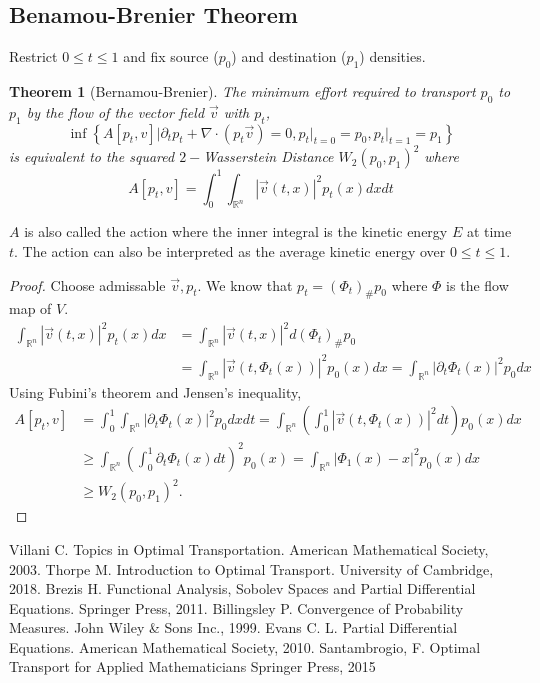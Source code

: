 \documentclass[12pt]{article}
\theoremstyle{plain}
\newtheorem{thm}{Theorem}[section]
\numberwithin{equation}{section}
\begin{document}
\subsection{Benamou-Brenier Theorem}
Restrict $0\le t \le 1$ and fix source ($p_0$) and destination ($p_1$) densities.
\begin{thm}[Bernamou-Brenier]
	The minimum effort required to transport $p_0$ to $p_1$ by the flow of the vector field $\vec{v}$ with $p_t$,
	\begin{equation}
		\inf\left\{A[p_t,v]\bigg\vert\partial_t p_t + \nabla \cdot (p_t \vec{v}) = 0,p_t\vert_{t=0}=p_0, p_t\vert_{t=1}=p_1\right\}
	\end{equation} 
	is equivalent to the squared $2-$Wasserstein Distance $W_2(p_0,p_1)^2$ where \[A[p_t,v] = \int_0^1\int_{\mathbb{R}^n} |\vec{v}(t,x)|^2p_t(x)dxdt\]
\end{thm}
$A$ is also called the action where the inner integral is the kinetic energy $E$ at time $t$. The action can also be interpreted as the average kinetic energy over $0\le t \le 1$. 
\begin{proof}
	Choose admissable $\vec{v},p_t$. We know that $p_t = (\Phi_t)_\#p_0$ where $\Phi$ is the flow map of $V$.
	\begin{align*}
		\int_{\mathbb{R}^n}|\vec{v}(t,x)|^2p_t(x)dx &= \int_{\mathbb{R}^n}|\vec{v}(t,x)|^2 d(\Phi_t)_\#p_0\\
		&= \int_{\mathbb{R}^n}|\vec{v}(t,\Phi_t(x))|^2p_0(x)dx = \int_{\mathbb{R}^n}|\partial_t\Phi_t(x)|^2p_0dx
	\end{align*}
	Using Fubini's theorem and Jensen's inequality,
	\begin{align*}
		A[p_t,v] &= \int_0^1\int_{\mathbb{R}^n}|\partial_t\Phi_t(x)|^2p_0dxdt= \int_{\mathbb{R}^n}\left(\int_0^1|\vec{v}(t,\Phi_t(x))|^2dt\right)p_0(x)dx \\
		&\ge \int_{\mathbb{R}^n}\left(\int_0^1\partial_t\Phi_t(x)dt\right)^2p_0(x) = \int_{\mathbb{R}^n}|\Phi_1(x) - x|^2p_0(x)dx\\
		& \ge W_2(p_0,p_1)^2.
	\end{align*}
\end{proof}
\begin{thebibliography}{9}
Villani C.
Topics in Optimal Transportation.
American Mathematical Society, 2003.
Thorpe M.
Introduction to Optimal Transport.
University of Cambridge, 2018.
Brezis H.
Functional Analysis, Sobolev Spaces and Partial Differential Equations. 
Springer Press, 2011.
Billingsley P.
Convergence of Probability Measures.
John Wiley \& Sons Inc., 1999.
Evans C. L.
Partial Differential Equations.
American Mathematical Society, 2010.
Santambrogio, F.
Optimal Transport for Applied Mathematicians
Springer Press, 2015
\end{thebibliography}
\end{document}
